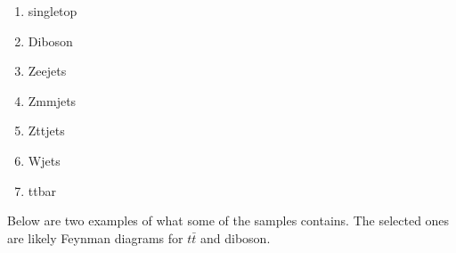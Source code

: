 \begin{enumerate}
    \item singletop 
    \item Diboson 
    \item Zeejets 
    \item Zmmjets 
    \item Zttjets 
    \item Wjets 
    \item ttbar
   
\end{enumerate}

 
Below are two examples of what some of the samples contains. The selected ones are likely Feynman diagrams for $t\bar{t}$ and diboson. 

